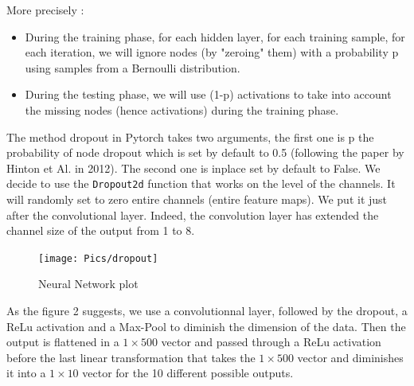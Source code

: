 More precisely :
\begin{itemize}
\item During the training phase, for each hidden layer, for each training sample, for each iteration, we will ignore nodes (by "zeroing" them) with a probability p using samples from a Bernoulli distribution.

\item During the testing phase, we will use (1-p) activations to take into account the missing nodes (hence activations) during the training phase.
\end{itemize}

The method dropout in Pytorch takes two arguments, the first one is p the probability of node dropout which is set by default to 0.5 (following the paper by Hinton et Al. in 2012). The second one is inplace set by default to False. We decide to use the \verb|Dropout2d| function that works on the level of the channels. It will randomly set to zero entire channels (entire feature maps).  We put it just after the convolutional layer. Indeed, the convolution layer has extended the channel size of the output from 1 to 8. \\
\begin{figure}[ht]
  \centering
  \texttt{[image: Pics/dropout]}
  \caption{Neural Network plot}
\end{figure}

As the figure 2 suggests, we use a convolutionnal layer, followed by the dropout, a ReLu activation and a Max-Pool to diminish the dimension of the data. Then the output is flattened in a $1\times 500$ vector and passed through a ReLu activation before the last linear transformation that takes the $1\times 500$ vector and diminishes it into a $1\times 10$ vector for the 10 different possible outputs. 
